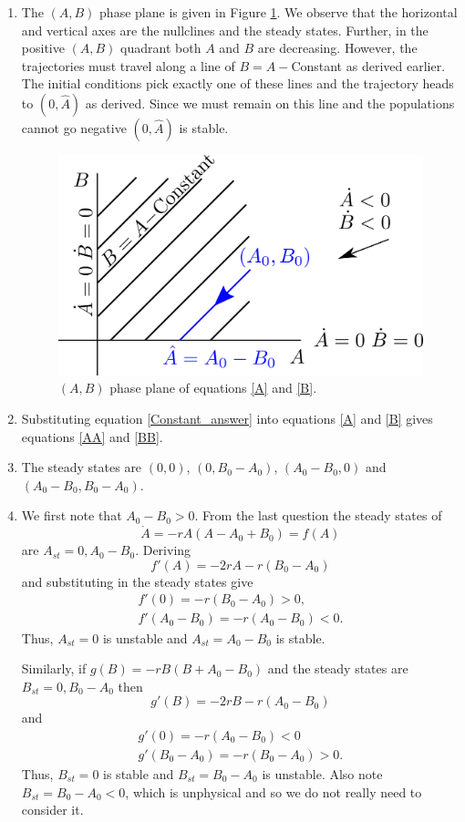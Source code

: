 \documentclass[10pt]{article}
\newcommand{\bb}{\begin{equation}}
\newcommand{\ee}{\end{equation}}
\newcommand{\fig}[1]{Figure \ref{#1}}
\newcommand{\eqn}[1]{equation \eqref{#1}}
\newcommand{\eqns}[2]{equations \eqref{#1} and \eqref{#2}}
\newcommand{\ttp}{.45\textwidth}
\renewcommand{\l}{\left(}
\renewcommand{\r}{\right)}
\begin{document}
\begin{Answ}
\begin{enumerate}
\item The $(A,B)$ phase plane is given in \fig{PPAB1}. We observe that the horizontal and vertical axes are the nullclines and the steady states. Further, in the positive $(A,B)$ quadrant both $A$ and $B$ are decreasing. However, the trajectories must travel along a line of $B=A-$Constant as derived earlier. The initial conditions pick exactly one of these lines and the trajectory heads to $\l 0,\hat{A} \r$ as derived. Since we must remain on this line and the populations cannot go negative $\l 0,\hat{A}\r$ is stable.
\begin{figure}[h!!!tb]
\centering
\includegraphics[width=\ttp]{../../Pictures/PPAB1}
\caption{\label{PPAB1} $(A,B)$ phase plane of \eqns{A}{B}.}
\end{figure}

\item Substituting \eqn{Constant_answer} into \eqns{A}{B} gives \eqns{AA}{BB}.
\item  The steady states are $(0,0)$, $(0,B_0-A_0)$, $(A_0-B_0,0)$ and $(A_0-B_0,B_0-A_0)$.

\item We first note that $A_0-B_0>0$. From the last question the steady states of 
\bb
\dot{A}=-rA(A-A_0+B_0)=f(A)
\ee
are  $A_{st}=0,A_0-B_0$. Deriving
\bb
f'(A)=-2rA-r(B_0-A_0)
\ee
and substituting in the steady states give
\begin{align}
f'(0)=-r(B_0-A_0)>0,\\
f'(A_0-B_0)=-r(A_0-B_0)<0.
\end{align}
Thus, $A_{st}=0$ is unstable and $A_{st}=A_0-B_0$ is stable.

Similarly, if $g(B)=-rB(B+A_0-B_0)$ and the steady states are $B_{st}=0, B_0-A_0$ then
\bb
g'(B)=-2rB-r(A_0-B_0)
\ee
and
\begin{align}
g'(0)=-r(A_0-B_0)<0\\
g'(B_0-A_0)=-r(B_0-A_0)>0.
\end{align}
Thus, $B_{st}=0$ is stable and $B_{st}=B_0-A_0$ is unstable. Also note $B_{st}=B_0-A_0<0$, which is unphysical and so we do not really need to consider it.


\end{enumerate}
\end{Answ}
\end{document}
